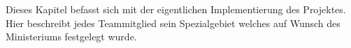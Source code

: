 
Dieses Kapitel befasst sich mit der eigentlichen Implementierung des Projektes. Hier beschreibt jedes Teammitglied sein Spezialgebiet welches auf Wunsch des Ministeriums festgelegt wurde.